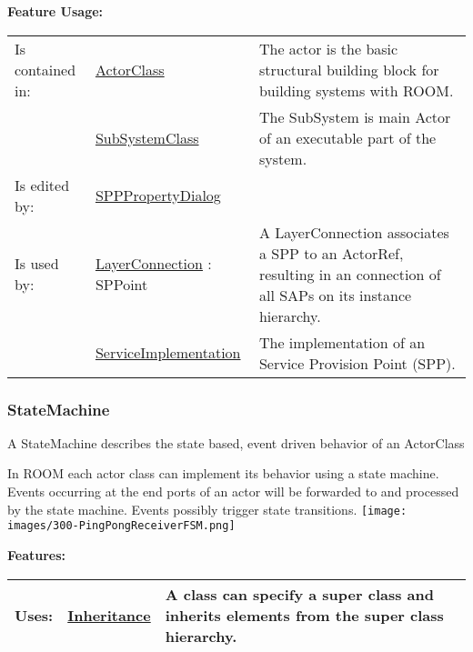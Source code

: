 		\begingroup
		\textbf{Feature Usage:}
		\renewcommand{\arraystretch}{1.8} %
		\begin{longtable}{l|l p{}}
			\hline
		Is contained in: & \tabitem \hyperlink{ref:ActorClass}{ActorClass}  & The actor is the basic structural building block for building systems with ROOM.\\
		& \tabitem \hyperlink{ref:SubSystemClass}{SubSystemClass}  & The SubSystem is main Actor of an executable part of the system.  \\
		\hline
		Is edited by: & \tabitem \hyperlink{ref:SPPPropertyDialog}{SPPPropertyDialog}  & \\
		\hline
		Is used by: & \tabitem \hyperlink{ref:LayerConnection}{LayerConnection} : SPPoint & A LayerConnection associates a SPP to an ActorRef, resulting in an connection of all SAPs on its instance hierarchy.\\
		& \tabitem \hyperlink{ref:ServiceImplementation}{ServiceImplementation}  & The implementation of an Service Provision Point (SPP). \\
		\hline
		\end{longtable}
		\endgroup
		
		
	\vspace{\baselineskip}
	\vspace{\baselineskip}
	\vspace{\baselineskip}
	
	\subsubsection{StateMachine}
		\hypertarget{ref:StateMachine}{}
		
		A StateMachine describes the state based, event driven behavior of an ActorClass
		
		In ROOM each actor class can implement its behavior using a state machine. Events occurring at the end ports of an actor will be forwarded to and processed by the state machine. Events possibly trigger state transitions.
		\texttt{[image: images/300-PingPongReceiverFSM.png]}
		
		
		\begingroup
		\textbf{Features:}
		\renewcommand{\arraystretch}{1.8} %
		\begin{longtable}{l|l p{}}
			\hline
		Uses: & \tabitem \hyperlink{ref:Inheritance}{Inheritance}  & A class can specify a super class and inherits elements from the super class hierarchy.\\
		\hline
		\end{longtable}
		\endgroup
		
